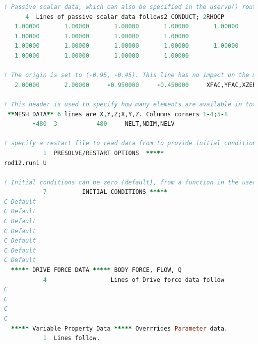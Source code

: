 \documentclass[10pt]{article}
\numberwithin{equation}{section} %
\begin{document}
\begin{itemize}
\begin{lstlisting}[language=Fortran]
! Passive scalar data, which can also be specified in the uservp() routine in the user file, can also be specified in this file. These lines list the values of conductivity in ascending order, followed by the heat capacity coefficients. A total of 9 passive scalars can be transported.
      4  Lines of passive scalar data follows2 CONDUCT; 2RHOCP
   1.00000       1.00000       1.00000       1.00000       1.00000
   1.00000       1.00000       1.00000       1.00000
   1.00000       1.00000       1.00000       1.00000       1.00000
   1.00000       1.00000       1.00000       1.00000
 
! The origin is set to (-0.95, -0.45). This line has no impact on the mesh being read in Nek.
   2.00000       2.00000     -0.950000     -0.450000     XFAC,YFAC,XZERO,YZERO

! This header is used to specify how many elements are available in total, the dimension of the problem, and how many elements are in the flow mesh (the fluid region?). A negative number of elements indicates that the element information is in the binary re2 file.
 **MESH DATA** 6 lines are X,Y,Z;X,Y,Z. Columns corners 1-4;5-8
        -480  3           480     NELT,NDIM,NELV
        
! specify a restart file to read data from to provide initial conditions (used commonly for these nonlinear equations). This is used to reduce error, since the rod12.run1 file likely was run with a much lower order. For a higher-order timestepping scheme, you'll need an equivalently larger number of restart files to provide the data points for method of lines time integration. This initial condition does not need to be of the same order as the current simulation. You can also specify the velocity and temperature from different files. The initial time is taken from the last specified restart file, but this can be overridden.
           1  PRESOLVE/RESTART OPTIONS  *****
rod12.run1 U

! Initial conditions can be zero (default), from a function in the user file, based on a ``pre-solve'', where a steady-state solution such as the Stokes equation is used as the initial condition for the transient solve, or from a restart file.
           7          INITIAL CONDITIONS *****
C Default
C Default
C Default
C Default
C Default
C Default
C Default
  ***** DRIVE FORCE DATA ***** BODY FORCE, FLOW, Q
           4                  Lines of Drive force data follow
C
C
C
C
  ***** Variable Property Data ***** Overrrides Parameter data.
           1  Lines follow.


\end{lstlisting}
\end{itemize}
\end{document}
